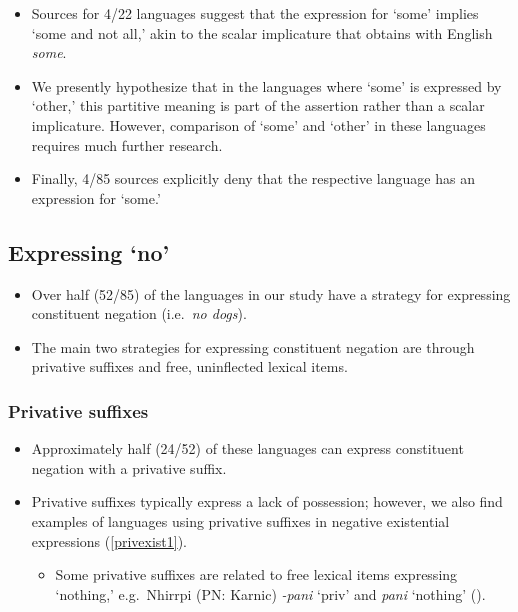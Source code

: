 \documentclass{article}
\makeatletter
\newcommand{\ofy}{/85} %
\makeatother
\begin{document}
\begin{itemize}
\item Sources for 4/22 languages suggest that the expression for `some' implies `some and not all,' akin to the scalar implicature that obtains with English {\it some}.
\item We presently hypothesize that in the languages where `some' is expressed by `other,' this partitive meaning is part of the assertion rather than a scalar implicature. However, comparison of `some' and `other' in these languages requires much further research.
\item Finally, 4\ofy{} sources explicitly deny that the respective language has an expression for `some.'
\end{itemize}



\subsection{Expressing `no'}

\begin{itemize}
\item Over half (52\ofy) of the languages in our study have a strategy for expressing constituent negation (i.e.\ {\it no dogs}).
\item The main two strategies for expressing constituent negation are through privative suffixes and free, uninflected lexical items.
\end{itemize}

\subsubsection{Privative suffixes}

\begin{itemize}
\item Approximately half (24/52)  of these languages can express constituent negation with a privative suffix.
\item Privative suffixes typically express a lack of possession; however, we also find examples of languages using privative suffixes in negative existential expressions (\ref{privexist1}).
  \begin{itemize}
  \item Some privative suffixes are related to free lexical items expressing `nothing,' e.g.\ Nhirrpi (PN: Karnic) \textit{-pani} `{\sc priv}' and \textit{pani} `nothing' (\citealt{bw05}).
  \end{itemize}
\end{itemize}
\end{document}
